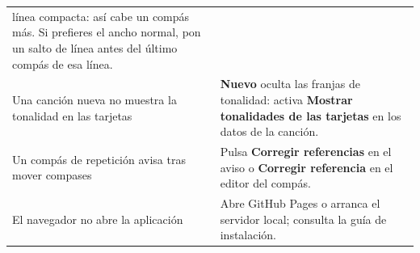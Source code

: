 \documentclass[a4paper,11pt]{article}
\begin{document}
{\begin{longtable}[]{@{}>{\raggedright\arraybackslash}p{}>{\raggedright\arraybackslash}p{}@{}}
línea compacta: así cabe un compás más. Si prefieres el ancho normal,
pon un salto de línea antes del último compás de esa línea. \\
Una canción nueva no muestra la tonalidad en las tarjetas &
\textbf{Nuevo} oculta las franjas de tonalidad: activa \textbf{Mostrar
tonalidades de las tarjetas} en los datos de la canción. \\
Un compás de repetición avisa tras mover compases & Pulsa
\textbf{Corregir referencias} en el aviso o \textbf{Corregir referencia}
en el editor del compás. \\
El navegador no abre la aplicación & Abre GitHub Pages o arranca el
servidor local; consulta la guía de instalación. \\
\end{longtable}
}
\end{document}
